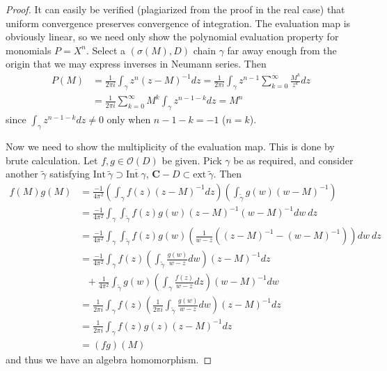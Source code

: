 \begin{proof}
    It can easily be verified (plagiarized from the proof in the real case) that uniform convergence preserves convergence of integration. The evaluation map is obviously linear, so we need only show the polynomial evaluation property for monomials $P = X^n$. Select a $(\sigma(M), D)$ chain $\gamma$ far away enough from the origin that we may express inverses in Neumann series. Then
    \begin{align*}
        P(M) &= \frac{1}{2 \pi i} \int_\gamma z^n (z - M)^{-1} dz = \frac{1}{2 \pi i} \int_\gamma z^{n-1} \sum_{k = 0}^\infty \frac{M^k}{z^k} dz\\
        &= \frac{1}{2 \pi i} \sum_{k = 0}^\infty M^k \int_\gamma z^{n - 1 - k} dz = M^n
    \end{align*}
    since $\int_\gamma z^{n-1-k} dz \neq 0$ only when $n - 1 - k = -1$ ($n = k$).

    Now we need to show the multiplicity of the evaluation map. This is done by brute calculation. Let $f,g \in \mathcal{O}(D)$ be given. Pick $\gamma$ be as required, and consider another $\tilde{\gamma}$ satisfying $\text{Int}\ \tilde{\gamma} \supset \overline{\text{Int}\ \gamma}$, $\mathbf{C} - D \subset \text{ext}\ \tilde{\gamma}$. Then
    \begin{align*}
        f(M) g(M) &= \frac{-1}{4 \pi^2} \left( \int_\gamma f(z) (z - M)^{-1} dz \right) \left( \int_{\tilde{\gamma}} g(w) (w - M)^{-1} \right)\\
        &= \frac{-1}{4 \pi^2} \int_\gamma \int_{\tilde{\gamma}} f(z) g(w) (z - M)^{-1} (w - M)^{-1} dw\ dz\\
        &= \frac{-1}{4 \pi^2} \int_\gamma \int_{\tilde{\gamma}} f(z) g(w) \left( \frac{1}{w - z} \left((z - M)^{-1} - (w - M)^{-1} \right) \right) dw\ dz\\
        &= \frac{-1}{4 \pi^2} \int_\gamma f(z) \left( \int_{\tilde{\gamma}} \frac{g(w)}{w - z} dw \right) (z - M)^{-1} dz\\
        &\ \ \ + \frac{1}{4 \pi^2} \int_{\tilde{\gamma}} g(w) \left( \int_\gamma \frac{f(z)}{w - z} dz \right) (w - M)^{-1} dw\\
        &= \frac{1}{2 \pi i} \int_\gamma f(z) \left( \frac{1}{2 \pi i} \int_{\tilde{\gamma}} \frac{g(w)}{w - z} dw \right) (z - M)^{-1} dz\\
        &= \frac{1}{2 \pi i} \int_\gamma f(z) g(z) (z - M)^{-1} dz\\
        &= (fg)(M)
    \end{align*}
    and thus we have an algebra homomorphism.
\end{proof}

